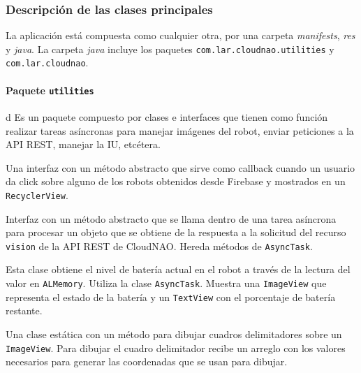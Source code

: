 \subsubsection{Descripción de las clases principales}
\label{\detokenize{dev_docs:documentacion-para-desarrolladores}}

La aplicación está compuesta como cualquier otra, por una
carpeta \textit{manifests}, \textit{res} y \textit{java}.
La carpeta \textit{java} incluye los paquetes \texttt{com.lar.cloudnao.utilities} y \texttt{com.lar.cloudnao}.


\paragraph{Paquete \texttt{utilities}}
d
Es un paquete compuesto por clases e interfaces que tienen como
función realizar tareas asíncronas para manejar imágenes del robot,
enviar peticiones a la API REST, manejar la IU, etcétera.


Una interfaz con un método abstracto que sirve como callback
cuando un usuario da click sobre alguno de los robots obtenidos desde Firebase y mostrados en un \texttt{RecyclerView}.


Interfaz con un método abstracto que se llama dentro de una tarea asíncrona para procesar un objeto que se obtiene de la respuesta
a la solicitud del recurso \texttt{vision} de la API REST de CloudNAO.
Hereda métodos de \texttt{AsyncTask}.


Esta clase obtiene el nivel de batería actual en el robot a través de la lectura del valor en 
\texttt{ALMemory}. Utiliza la clase \texttt{AsyncTask}.
Muestra una \texttt{ImageView} que representa el estado de la batería y un \texttt{TextView} con el porcentaje de batería restante.


Una clase estática con un método para dibujar cuadros delimitadores 
sobre un \texttt{ImageView}. Para dibujar el cuadro delimitador 
recibe un arreglo con los valores necesarios para generar las 
coordenadas que se usan para dibujar.


